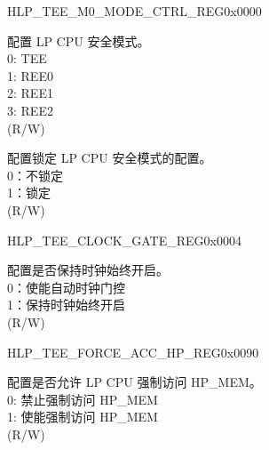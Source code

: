 \begin{register}{H}{LP\_TEE\_M0\_MODE\_CTRL\_REG}{0x0000}\label{regdesc:LPTEEM0MODECTRLREG}
%
%
%
\regnewline%
\begin{regdesc}\begin{reglist}
\label{fielddesc:LPTEEM0MODE}\item [LP\_TEE\_M0\_MODE] 配置 LP CPU 安全模式。\\
0: TEE \\
1: REE0 \\
2: REE1 \\
3: REE2  \\
(R/W)
\label{fielddesc:LPTEEM0LOCK}\item [LP\_TEE\_M0\_LOCK] 配置锁定 LP CPU 安全模式的配置。\\
0：不锁定 \\
1：锁定  \\ (R/W)
\end{reglist}\end{regdesc}
\end{register}


\begin{register}{H}{LP\_TEE\_CLOCK\_GATE\_REG}{0x0004}\label{regdesc:LPTEECLOCKGATEREG}
%
%
\regnewline%
\begin{regdesc}\begin{reglist}
\label{fielddesc:LPTEECLKEN}\item [LP\_TEE\_CLK\_EN] 配置是否保持时钟始终开启。\\
0：使能自动时钟门控 \\
1：保持时钟始终开启 \\ (R/W)
\end{reglist}\end{regdesc}
\end{register}


\begin{register}{H}{LP\_TEE\_FORCE\_ACC\_HP\_REG}{0x0090}\label{regdesc:LPTEEFORCEACCHPREG}
%
%
\regnewline%
\begin{regdesc}\begin{reglist}
\label{fielddesc:LPTEEFORCEACCHPMEMEN}\item [LP\_TEE\_FORCE\_ACC\_HPMEM\_EN] 配置是否允许 LP CPU 强制访问 HP\_MEM。\\
0: 禁止强制访问 HP\_MEM \\
1: 使能强制访问 HP\_MEM  \\ (R/W)
\end{reglist}\end{regdesc}
\end{register}


